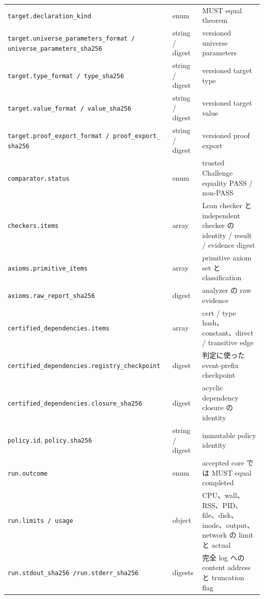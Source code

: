 \documentclass[a4paper,11pt]{ltjsarticle}
\newcommand{\code}[1]{\texttt{#1}}
\begin{document}
\begin{longtable}{@{}L{44mm}L{27mm}L{72mm}@{}}
\code{target.declaration\_kind} & enum & MUST equal theorem \\
\code{target.universe\_}\newline\code{parameters\_format /}\newline
\code{universe\_parameters\_}\newline\code{sha256} & string / digest & versioned universe parameters \\
\code{target.type\_format / type\_sha256} & string / digest & versioned target type \\
\code{target.value\_format / value\_sha256} & string / digest & versioned target value \\
\code{target.proof\_export\_}\newline\code{format / proof\_export\_}\newline
\code{sha256} & string / digest & versioned proof export \\
\code{comparator.status} & enum & trusted Challenge equality PASS / non-PASS \\
\code{checkers.items} & array & Lean checker と independent checker の identity / result / evidence digest \\
\code{axioms.primitive\_items} & array & primitive axiom set と classification \\
\code{axioms.raw\_report\_sha256} & digest & analyzer の raw evidence \\
\code{certified\_dependencies.}\newline\code{items} & array & cert / type hash、constant、direct / transitive edge \\
\code{certified\_dependencies.}\newline\code{registry\_checkpoint} & digest & 判定に使った event-prefix checkpoint \\
\code{certified\_dependencies.}\newline\code{closure\_sha256} & digest & acyclic dependency closure の identity \\
\code{policy.id}, \code{policy.sha256} & string / digest & immutable policy identity \\
\code{run.outcome} & enum & accepted core では MUST equal completed \\
\code{run.limits / usage} & object & CPU、wall、RSS、PID、file、disk、inode、output、network の limit と actual \\
\code{run.stdout\_sha256 /}\newline\code{run.stderr\_sha256} & digests & 完全 log への content address と truncation flag \\

\end{longtable}
\end{document}
